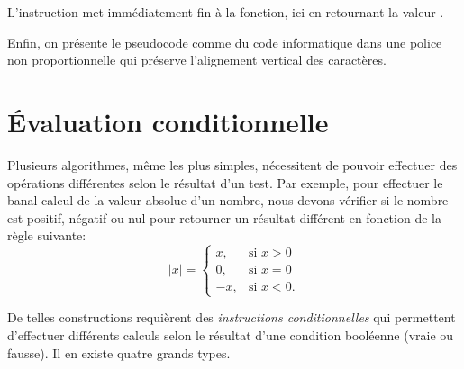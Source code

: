 L'instruction  met immédiatement fin à la fonction,
ici en retournant la valeur .

Enfin, on présente le pseudocode comme du code informatique dans une
police non proportionnelle qui préserve l'alignement vertical des
caractères.


\section{Évaluation conditionnelle}
\label{sec:algorithmes:if-else}

Plusieurs algorithmes, même les plus simples, nécessitent de pouvoir
effectuer des opérations différentes selon le résultat d'un test. Par
exemple, pour effectuer le banal calcul de la valeur absolue d'un
nombre, nous devons vérifier si le nombre est positif, négatif ou nul
pour retourner un résultat différent en fonction de la règle suivante:
\begin{equation*}
  \lvert x \rvert =
  \begin{cases}
    x, & \text{si } x > 0 \\
    0, & \text{si } x = 0 \\
    -x, & \text{si } x < 0.
  \end{cases}
\end{equation*}

De telles constructions requièrent des \emph{instructions
  conditionnelles} qui permettent d'effectuer différents calculs selon
le résultat d'une condition booléenne (vraie ou fausse). Il en existe
quatre grands types.

